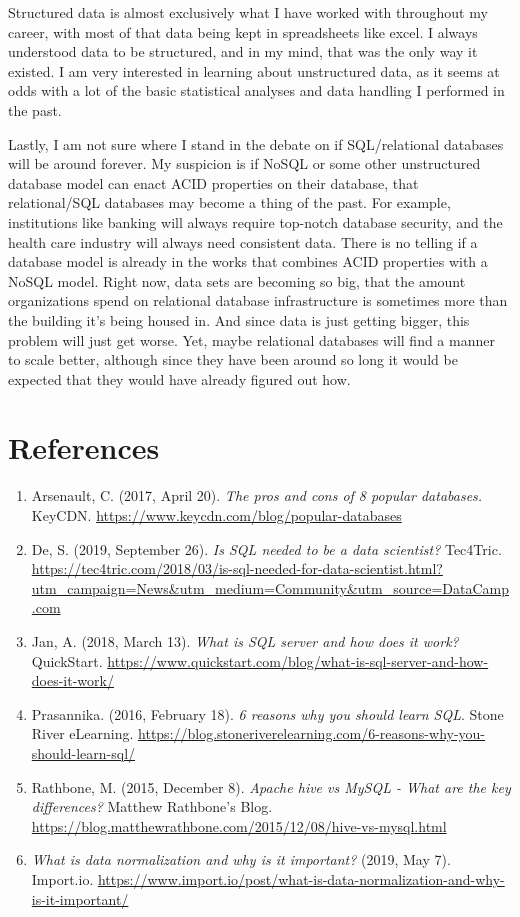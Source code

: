 \documentclass[]{article}
\begin{document}
Structured data is almost exclusively what I have worked with throughout my career, with most of that data being kept in spreadsheets like excel.  I always understood data to be structured, and in my mind, that was the only way it existed.  I am very interested in learning about unstructured data, as it seems at odds with a lot of the basic statistical analyses and data handling I performed in the past.

Lastly, I am not sure where I stand in the debate on if SQL/relational databases will be around forever.  My suspicion is if NoSQL or some other unstructured database model can enact ACID properties on their database, that relational/SQL databases may become a thing of the past.  For example, institutions like banking will always require top-notch database security, and the health care industry will always need consistent data.  There is no telling if a database model is already in the works that combines ACID properties with a NoSQL model.  Right now, data sets are becoming so big, that the amount organizations spend on relational database infrastructure is sometimes more than the building it's being housed in.  And since data is just getting bigger, this problem will just get worse.  Yet, maybe relational databases will find a manner to scale better, although since they have been around so long it would be expected that they would have already figured out how.
\section{References}

\begin{enumerate}
	\item Arsenault, C. (2017, April 20). \textit{The pros and cons of 8 popular databases.} KeyCDN. \url{https://www.keycdn.com/blog/popular-databases}
	
	\item De, S. (2019, September 26). \textit{Is SQL needed to be a data scientist?} Tec4Tric. \url{https://tec4tric.com/2018/03/is-sql-needed-for-data-scientist.html?utm_campaign=News&utm_medium=Community&utm_source=DataCamp.com}
	
	\item Jan, A. (2018, March 13). \textit{What is SQL server and how does it work?} QuickStart. \url{https://www.quickstart.com/blog/what-is-sql-server-and-how-does-it-work/}
	
	\item Prasannika. (2016, February 18). \textit{6 reasons why you should learn SQL}. Stone River eLearning. \url{https://blog.stoneriverelearning.com/6-reasons-why-you-should-learn-sql/}
	
	\item Rathbone, M. (2015, December 8). \textit{Apache hive vs MySQL - What are the key differences?} Matthew Rathbone's Blog. \url{https://blog.matthewrathbone.com/2015/12/08/hive-vs-mysql.html}
	
	\item \textit{What is data normalization and why is it important?} (2019, May 7). Import.io. \url{https://www.import.io/post/what-is-data-normalization-and-why-is-it-important/}
\end{enumerate}
\end{document}
